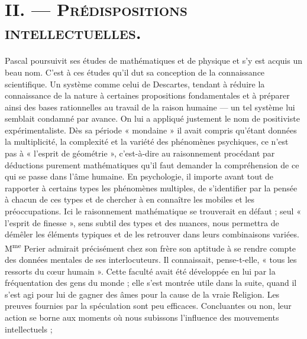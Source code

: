 \documentclass[12pt,a4paper]{article}
\newcommand{\opage}[1]{\marginnote{\footnotesize\textit{[#1]}}}
\begin{document}


\opage{230} %
\section*{II. --- \textsc{Prédispositions intellectuelles.}}

Pascal poursuivit ses études de mathématiques et de physique et
s'y est acquis un beau nom. C'est à ces études qu'il dut sa conception
de la connaissance scientifique. Un système comme celui de
Descartes, tendant à réduire la connaissance de la nature à certaines propositions fondamentales et à préparer ainsi des bases
rationnelles au travail de la raison humaine --- un tel système lui
semblait condamné par avance. On lui a appliqué justement le
nom de positiviste expérimentaliste. Dès sa période « mondaine »
il avait compris qu'étant données la multiplicité, la complexité et la
variété des phénomènes psychiques, ce n'est pas à « l'esprit de
géométrie », c'est-à-dire au raisonnement procédant par déductions
purement mathématiques qu'il faut demander la compréhension de
ce qui se passe dans l'âme humaine. En psychologie, il importe
avant tout de rapporter à certains types les phénomènes multiples,
de s'identifier par la pensée à chacun de ces types et de chercher à
en connaître les mobiles et les préoccupations. Ici le raisonnement
mathématique se trouverait en défaut ; seul « l'esprit de finesse »,
sens subtil des types et des nuances, nous permettra de démêler
les éléments typiques et de les retrouver dans leurs combinaisons
variées. M\textsuperscript{me} Perier admirait précisément chez son frère son aptitude
à se rendre compte des données mentales de ses interlocuteurs.
Il connaissait, pense-t-elle, « tous les ressorts du cœur
humain ». Cette faculté avait été développée en lui par la fréquentation
des gens du monde ; elle s'est montrée utile dans la suite,
quand il s'est agi pour lui de gagner des âmes pour la cause de la
vraie Religion. Les preuves fournies par la spéculation sont peu
efficaces. Concluantes ou non, leur action se borne aux moments
où nous subissons l'influence des mouvements intellectuels ;
\end{document}
